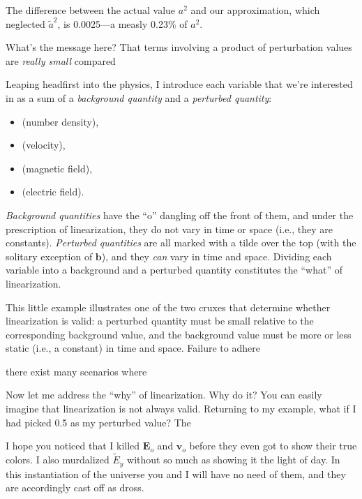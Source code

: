 The difference between the actual value $a^2$ and our approximation, which
neglected $\tilde a^2$, is 0.0025---a measly 0.23\% of $a^2$.

What's the message here? That terms involving a product of perturbation values
are \emph{really small} compared 

Leaping headfirst into the physics, I introduce each variable that we're
interested in as a sum of a \emph{background quantity} and a \emph{perturbed
  quantity}: \par
\begin{itemize}
\item {} (number density),
\item {} (velocity),
\item {} (magnetic field),
\item {} (electric field).
\end{itemize}
\emph{Background quantities} have the ``o'' dangling off the front of them, and
under the prescription of linearization, they do not vary in time or space
(i.e., they are constants). \emph{Perturbed quantities} are all marked with a
tilde over the top (with the solitary exception of $\mathbf{b}$), and they
\emph{can} vary in time and space. Dividing each variable into a background and
a perturbed quantity constitutes the ``what'' of linearization.


This little example illustrates one of the two cruxes that determine whether
linearization is valid: a perturbed quantity must be small relative to the
corresponding background value, and the background value must be more or less
static (i.e., a constant) in time and space. Failure to adhere

there exist many scenarios where 

Now let me address the ``why'' of linearization. Why do it? You can easily
imagine that linearization is not always valid. Returning to my example, what if I had picked 0.5 as my perturbed value? The 

I hope you noticed that I killed $\mathbf{E}_o$ and $\mathbf{v}_o$ before they
even got to show their true colors. I also murdalized $\tilde E_y$ without so
much as showing it the light of day. In this instantiation of the universe you
and I will have no need of them, and they are accordingly cast off as dross.

